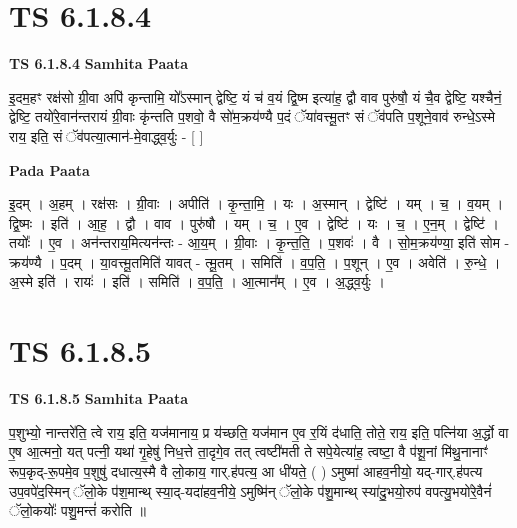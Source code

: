\documentclass[17pt]{extarticle}
\begin{document}
\section*{ TS 6.1.8.4 }

\textbf{TS 6.1.8.4 } \newline
\textbf{Samhita Paata} \newline

इ॒दम॒हꣳ रक्ष॑सो ग्री॒वा अपि॑ कृन्तामि॒ यो᳚ऽस्मान् द्वेष्टि॒ यं च॑ व॒यं द्वि॒ष्म इत्या॑ह॒ द्वौ वाव पुरु॑षौ॒ यं चै॒व द्वेष्टि॒ यश्चैनं॒ द्वेष्टि॒ तयो॑रे॒वान॑न्तरायं ग्री॒वाः कृ॑न्तति प॒शवो॒ वै सो॑म॒क्रय॑ण्यै प॒दं ॅया॑वत्त्मू॒तꣳ सं ॅव॑पति प॒शूने॒वाव॑ रुन्धे॒ऽस्मे राय॒ इति॒ सं ॅव॑पत्या॒त्मान॑-मे॒वाद्ध्व॒र्युः - [  ] \newline

\textbf{Pada Paata} \newline

इ॒दम् । अ॒हम् । रक्ष॑सः । ग्री॒वाः । अपीति॑ । कृ॒न्ता॒मि॒ । यः । अ॒स्मान् । द्वेष्टि॑ । यम् । च॒ । व॒यम् । द्वि॒ष्मः । इति॑ । आ॒ह॒ । द्वौ । वाव । पुरु॑षौ । यम् । च॒ । ए॒व । द्वेष्टि॑ । यः । च॒ । ए॒न॒म् । द्वेष्टि॑ । तयोः᳚ । ए॒व । अन॑न्तराय॒मित्यन॑न्तः - आ॒य॒म् । ग्री॒वाः । कृ॒न्त॒ति॒ । प॒शवः॑ । वै । सो॒म॒क्रय॑ण्या॒ इति॑ सोम - क्रय॑ण्यै । प॒दम् । या॒वत्त्मू॒तमिति॑ यावत् - त्मू॒तम् । समिति॑ । व॒प॒ति॒ । प॒शून् । ए॒व । अवेति॑ । रु॒न्धे॒ । अ॒स्मे इति॑ । रायः॑ । इति॑ । समिति॑ । व॒प॒ति॒ । आ॒त्मान᳚म् । ए॒व । अ॒द्ध्व॒र्युः ।  \newline




\section*{ TS 6.1.8.5 }

\textbf{TS 6.1.8.5 } \newline
\textbf{Samhita Paata} \newline

प॒शुभ्यो॒ नान्तरे॑ति॒ त्वे राय॒ इति॒ यज॑मानाय॒ प्र य॑च्छति॒ यज॑मान ए॒व र॒यिं द॑धाति॒ तोते॒ राय॒ इति॒ पत्नि॑या अ॒र्द्धो वा ए॒ष आ॒त्मनो॒ यत् पत्नी॒ यथा॑ गृ॒हेषु॑ निध॒त्ते ता॒दृगे॒व तत् त्वष्टी॑मती ते सपे॒येत्या॑ह॒ त्वष्टा॒ वै प॑शू॒नां मि॑थु॒नानाꣳ॑ रूप॒कृद्-रू॒पमे॒व प॒शुषु॑ दधात्य॒स्मै वै लो॒काय॒ गार्.ह॑पत्य॒ आ धी॑यते॒ ( ) ऽमुष्मा॑ आहव॒नीयो॒ यद्-गार्.ह॑पत्य उप॒वपे॑द॒स्मिन् ॅलो॒के प॑श॒मान्थ् स्या॒द्-यदा॑हव॒नीये॒ ऽमुष्मि॑न् ॅलो॒के प॑शु॒मान्थ् स्या॑दु॒भयो॒रुप॑ वपत्यु॒भयो॑रे॒वैनं॑ ॅलो॒कयोः᳚ पशु॒मन्तं॑ करोति ॥ \newline
\end{document}
